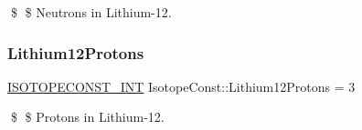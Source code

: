 \$ \$ Neutrons in Lithium-\/12. \mbox{\label{group___isotope_const-_lithium-_li12_ga5fbd3470395413884ac1a06b249f49f3}} 
\subsubsection{\texorpdfstring{Lithium12\+Protons}{Lithium12Protons}}
{\footnotesize\ttfamily \mbox{\hyperlink{group___isotope_const-_macros_ga5f18360b3e99483a35c32d789e62621c}{I\+S\+O\+T\+O\+P\+E\+C\+O\+N\+S\+T\+\_\+\+I\+NT}} Isotope\+Const\+::\+Lithium12\+Protons = 3}

\$ \$ Protons in Lithium-\/12. 
